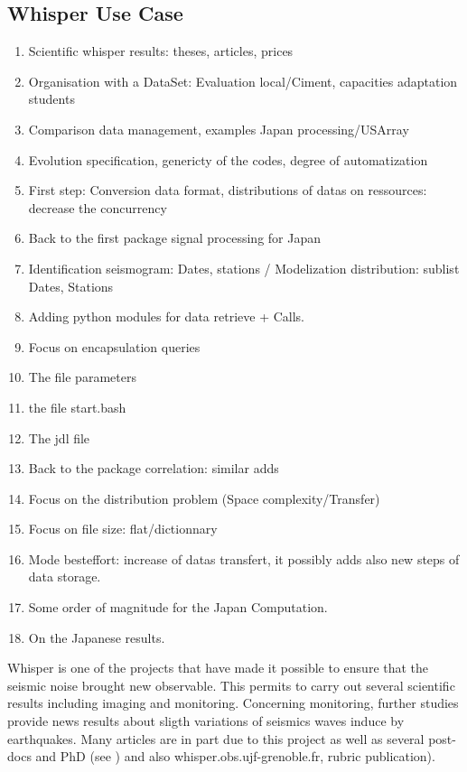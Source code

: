 \documentclass[a4paper, 10pt]{article}
\begin{document}
\begin{multicols}{2}
\subsection{Whisper Use Case}

	\begin{enumerate}
	  \item Scientific whisper results: theses, articles, prices
  	  \item Organisation with a DataSet: Evaluation local/Ciment, capacities adaptation students
  	  \item Comparison data management, examples Japan processing/USArray 
  	  \item Evolution specification, genericty of the codes, degree of automatization
  	  \item First step: Conversion data format, distributions of datas on ressources: decrease the concurrency
  	  \item Back to the first package signal processing for Japan
  	  \item Identification seismogram: Dates, stations  / Modelization distribution: sublist Dates, Stations
  	  \item Adding python modules for data retrieve + Calls.
  	  \item Focus on encapsulation queries
      \item The file parameters
      \item the file start.bash
      \item The jdl file
  	  \item Back to the package correlation: similar adds 
  	  \item Focus on the distribution problem (Space complexity/Transfer)
  	  \item Focus on file size: flat/dictionnary
  	  \item Mode besteffort: increase of datas transfert, it possibly adds also new steps of data storage.
  	  \item Some order of magnitude for the Japan Computation.
  	  \item On the Japanese results.
  	\end{enumerate}


Whisper is one of the projects that have made it possible to ensure that the seismic noise brought new observable.
This permits to carry out several scientific results including imaging and monitoring. 
Concerning monitoring, further studies provide news results about sligth variations of seismics waves induce by earthquakes.
Many articles are in part due to this project as well as
several post-docs and PhD (see \cite{key:CFLC2010, key:BPCPBR, key:HCM2014, key:OPLC2013, key:PCP}) and also whisper.obs.ujf-grenoble.fr, rubric publication).



\end{multicols}
\end{document}
